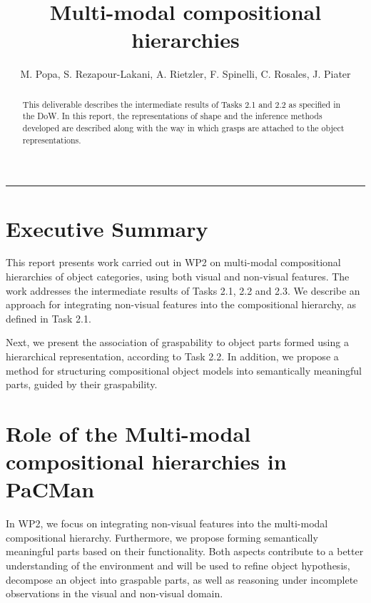 \documentclass[a4paper,11pt,pdf]{pacmanreport}
\title{Multi-modal compositional hierarchies}
\author{M. Popa, S. Rezapour-Lakani, A. Rietzler, F. Spinelli, C. Rosales, J. Piater}
\begin{document}
\maketitle

\begin{abstract}
\noindent This deliverable describes the intermediate results of Tasks 2.1 and 2.2 as specified in the DoW. In this report, the representations of shape and the inference methods developed are described along with the way in which grasps are attached to the object representations.
\end{abstract}

\vspace{.2em}
\hrule

\footnotesize

\tableofcontents

\normalsize

\newpage

\section*{Executive Summary}

This report presents work carried out in WP2 on multi-modal compositional hierarchies of object categories, using both visual and non-visual features. The 
work addresses the intermediate results of Tasks 2.1, 2.2 and 2.3. We describe 
an approach for integrating non-visual features into the compositional 
hierarchy, as defined in Task 2.1.

Next, we present the association of graspability to object parts formed using a hierarchical representation, according to Task 2.2. In addition, we propose a 
method for structuring compositional object models into semantically meaningful 
parts, guided by their graspability.

\section*{Role of the Multi-modal compositional hierarchies in PaCMan}

In WP2, we focus on integrating non-visual features into the multi-modal compositional hierarchy. Furthermore, we propose forming semantically meaningful parts based on their functionality. Both aspects contribute to a better 
understanding of the environment and  will be used to refine object hypothesis, 
decompose an object into graspable parts, as well as reasoning under incomplete 
observations in the visual and non-visual domain.
\end{document}
